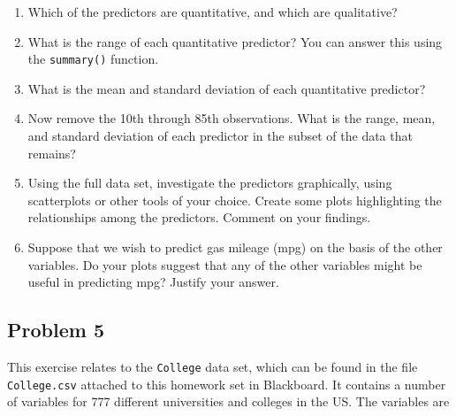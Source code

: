\documentclass[
]{article}
\providecommand{\tightlist}{%
  \setlength{\itemsep}{0pt}\setlength{\parskip}{0pt}}
\begin{document}
\begin{enumerate}
\def\labelenumi{(\alph{enumi})}
\tightlist
\item
  Which of the predictors are quantitative, and which are qualitative?\\
\item
  What is the range of each quantitative predictor? You can answer this
  using the \texttt{summary()} function.\\
\item
  What is the mean and standard deviation of each quantitative
  predictor?\\
\item
  Now remove the 10th through 85th observations. What is the range,
  mean, and standard deviation of each predictor in the subset of the
  data that remains?\\
\item
  Using the full data set, investigate the predictors graphically, using
  scatterplots or other tools of your choice. Create some plots
  highlighting the relationships among the predictors. Comment on your
  findings.\\
\item
  Suppose that we wish to predict gas mileage (mpg) on the basis of the
  other variables. Do your plots suggest that any of the other variables
  might be useful in predicting mpg? Justify your answer.
\end{enumerate}

\hypertarget{problem-5}{%
\subsection{Problem 5}\label{problem-5}}

This exercise relates to the \texttt{College} data set, which can be
found in the file \texttt{College.csv} attached to this homework set in
Blackboard. It contains a number of variables for 777 different
universities and colleges in the US. The variables are
\end{document}
